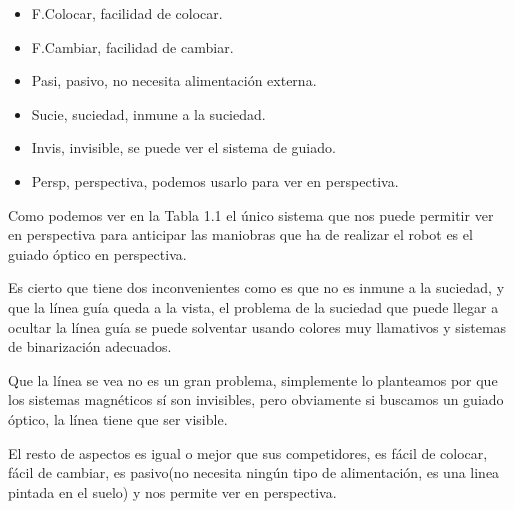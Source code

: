 \begin{itemize}
	\item F.Colocar, facilidad de colocar.
	\item F.Cambiar, facilidad de cambiar.
	\item Pasi, pasivo, no necesita alimentación externa.
	\item Sucie, suciedad, inmune a la suciedad.
	\item Invis, invisible, se puede ver el sistema de guiado.
	\item Persp, perspectiva, podemos usarlo para ver en perspectiva.
\end{itemize}

Como podemos ver en la Tabla 1.1 el único sistema que nos puede permitir ver en perspectiva para anticipar las maniobras que ha de realizar el robot es el guiado óptico en perspectiva. 

Es cierto que tiene dos inconvenientes como es que no es inmune a la suciedad, y que la línea guía queda a la vista, el problema de la suciedad que puede llegar a ocultar la línea guía se puede solventar usando colores muy llamativos y sistemas de binarización adecuados.

Que la línea se vea  no es un gran problema, simplemente lo planteamos por que los sistemas magnéticos sí son invisibles, pero obviamente si buscamos un guiado óptico, la línea tiene que ser visible.

El resto de aspectos es igual o mejor que sus competidores, es fácil de colocar, fácil de cambiar, es pasivo(no necesita ningún tipo de alimentación, es una linea pintada en el suelo) y nos permite ver en perspectiva.